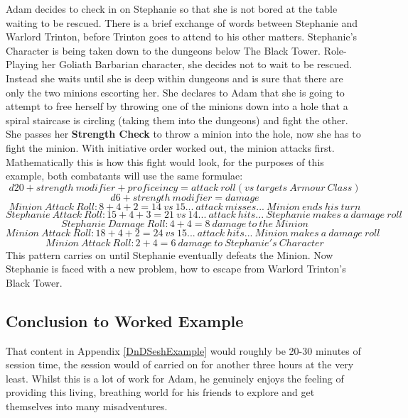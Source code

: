 \documentclass[review]{cmpreport}
\begin{document}
	Adam decides to check in on Stephanie so that she is not bored at the table waiting to be rescued. There is a brief exchange of words between Stephanie and Warlord Trinton, before Trinton goes to attend to his other matters. Stephanie's Character is being taken down to the dungeons below The Black Tower. Role-Playing her Goliath Barbarian character, she decides not to wait to be rescued. Instead she waits until she is deep within dungeons and is sure that there are only the two minions escorting her. She declares to Adam that she is going to attempt to free herself by throwing one of the minions down into a hole that a spiral staircase is circling (taking them into the dungeons) and fight the other. She passes her \textbf{Strength Check} to throw a minion into the hole, now she has to fight the minion. With initiative order worked out, the minion attacks first. Mathematically this is how this fight would look, for the purposes of this example, both combatants will use the same formulae:
	\[d20 + strength \ modifier + proficeincy = attack \ roll (vs \ targets \ Armour \ Class)\]
	\[d6 + strength \ modifier = damage\]
	\[Minion \ Attack \ Roll: 8 + 4 + 2 = 14 \ vs \ 15 ... \ attack \ misses ... \ Minion \ ends \ his \ turn\]
	\[Stephanie \ Attack \ Roll: 15 + 4 + 3 = 21 \ vs \ 14 ... \ attack \ hits ... \ Stephanie \ makes \ a \ damage \ roll\]
	\[Stephanie \ Damage \ Roll: 4 + 4 = 8 \ damage \ to \ the \ Minion\]
	\[Minion \ Attack \ Roll: 18 + 4 + 2 = 24 \ vs \ 15 ... \ attack \ hits ... \ Minion \ makes \ a \ damage \ roll\]
	\[Minion \ Attack \ Roll: 2 + 4 = 6 \ damage \ to \ Stephanie's \ Character\]
	This pattern carries on until Stephanie eventually defeats the Minion. Now Stephanie is faced with a new problem, how to escape from Warlord Trinton's Black Tower.
	
	\subsection{Conclusion to Worked Example}\label{DnDWEConc}
	That content in Appendix \ref{DnDSeshExample} would roughly be 20-30 minutes of session time, the session would of carried on for another three hours at the very least. Whilst this is a lot of work for Adam, he genuinely enjoys the feeling of providing this living, breathing world for his friends to explore and get themselves into many misadventures.
	
	\clearpage
	

\end{document}
